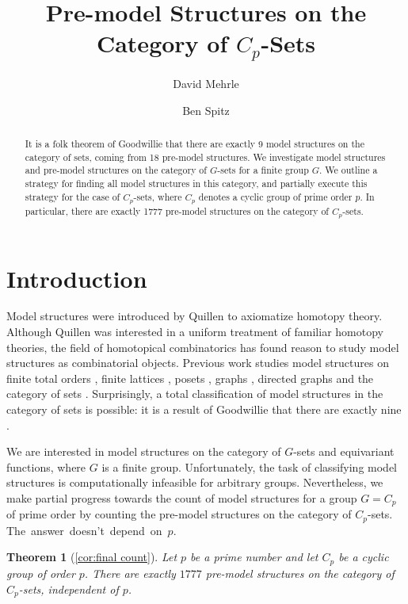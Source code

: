 \documentclass{amsart}
\title{Pre-model Structures on the Category of \texorpdfstring{$C_p$}{Cₚ}-Sets}
\author[D. Mehrle]{David Mehrle}
\author[B. Spitz]{Ben Spitz}
\numberwithin{equation}{section}
\newtheorem*{theorem*}{Theorem}
\theoremstyle{definition}
\begin{document}
\begin{abstract}
	It is a folk theorem of Goodwillie that there are exactly 9 model structures on the category of sets, coming from 18 pre-model structures. 
	We investigate model structures and pre-model structures on the category of $G$-sets for a finite group $G$. 
	We outline a strategy for finding all model structures in this category, and partially execute this strategy  for the case of $C_p$-sets, where $C_p$ denotes a cyclic group of prime order $p$. 
	In particular, there are exactly 1777 pre-model structures on the category of $C_p$-sets.
\end{abstract}

\maketitle

\setcounter{tocdepth}{1}
\tableofcontents

\vspace*{-2em}

\section{Introduction}

Model structures were introduced by Quillen \cite{Quillen1967} to axiomatize homotopy theory. Although Quillen was interested in a uniform treatment of familiar homotopy theories, the field of homotopical combinatorics has found reason to study model structures as combinatorial objects. Previous work studies model structures on finite total orders \cite{BOOR2023}, finite lattices \cite{MORSVZ2025}, posets \cite{DZ2021},  graphs \cite{Droz2012}, directed graphs \cite{CDKOSW2022} and the category of sets \cite{ACB2025}. Surprisingly, a total classification of model structures in the category of sets is possible: it is a result of Goodwillie that there are exactly nine \cite{ACB2025}.

We are interested in model structures on the category of $G$-sets and equivariant functions, where $G$ is a finite group. Unfortunately, the task of classifying model structures is computationally infeasible for arbitrary groups. Nevertheless, we make partial progress towards the count of model structures for a group $G = C_p$ of prime order by counting the pre-model structures on the category of $C_p$-sets. The~answer~doesn't~depend~on~$p$.

\begin{theorem*}[\cref{cor:final count}]
	Let $p$ be a prime number and let $C_p$ be a cyclic group of order $p$. There are exactly $1777$ pre-model structures on the category of $C_p$-sets, independent of $p$. 
\end{theorem*}
\end{document}

